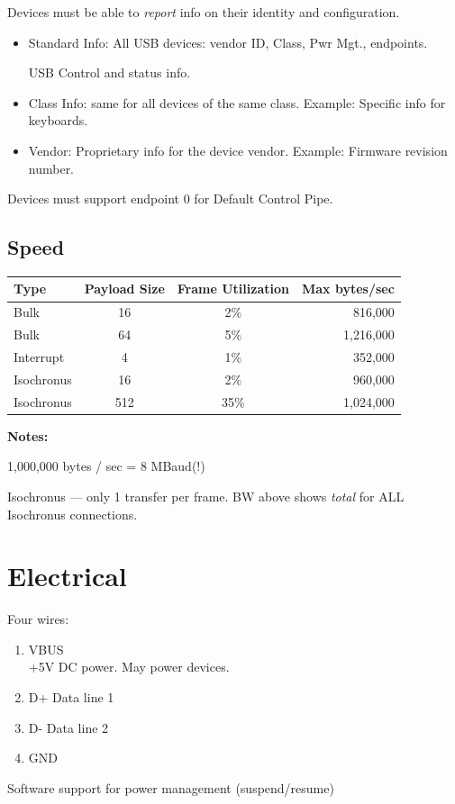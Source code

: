 \documentclass{article}	%
\begin{document}
Devices must be able to {\it report} info on their identity
and configuration.

\begin{itemize}
        \item Standard Info: All USB devices:
        vendor ID, Class, Pwr Mgt., endpoints.

        USB Control and status info.

        \item Class Info: same for all devices of
        the same class.  Example: Specific info for
        keyboards.

        \item Vendor: Proprietary info for the
        device vendor.  Example: Firmware revision
        number.

\end{itemize}
Devices must support endpoint 0 for Default Control Pipe.



\subsection{Speed}
\begin{tabular}{|l|c|c|r|}
\hline
Type	&  Payload Size	& Frame Utilization & Max bytes/sec \\ \hline
\hline
Bulk	&  16		& 2\%		    & 816,000	    \\ \hline
Bulk	&  64		& 5\%		    & 1,216,000    \\ \hline
Interrupt & 4		& 1\%		    & 352,000    \\ \hline
Isochronus & 16		& 2\%		    & 960,000    \\ \hline
Isochronus & 512	& 35\%		    & 1,024,000 \\ \hline

\end{tabular}

{\bf Notes:}

 1,000,000 bytes / sec = 8 MBaud(!)

 Isochronus --- only 1 transfer per frame.  BW above shows {\it total }
 for ALL Isochronus connections.



\section{Electrical}
Four wires:
\begin{enumerate}
        \item V{\sc BUS} \\
        +5V DC power.  May power devices.
        \item D+  Data line 1
        \item D-  Data line 2
        \item GND
\end{enumerate}
Software support for power management (suspend/resume)
\end{document}
